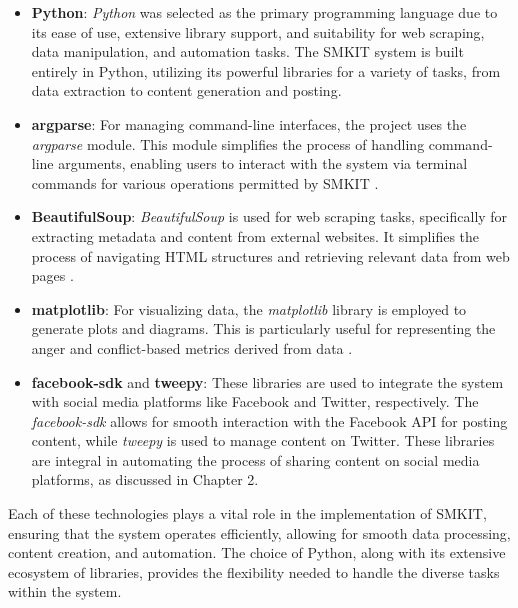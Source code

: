 \begin{itemize}
    \item \textbf{Python}: \textit{Python} was selected as the primary programming language due to its ease of use, extensive library support, and suitability for web scraping, data manipulation, and automation tasks. The SMKIT system is built entirely in Python, utilizing its powerful libraries for a variety of tasks, from data extraction to content generation and posting.
    
    \item \textbf{argparse}: For managing command-line interfaces, the project uses the \textit{argparse} module. This module simplifies the process of handling command-line arguments, enabling users to interact with the system via terminal commands for various operations permitted by SMKIT \cite{argparse_documentation}.

    \item \textbf{BeautifulSoup}: \textit{BeautifulSoup} is used for web scraping tasks, specifically for extracting metadata and content from external websites. It simplifies the process of navigating HTML structures and retrieving relevant data from web pages \cite{beautifulsoup_documentation}.

    \item \textbf{matplotlib}: For visualizing data, the \textit{matplotlib} library is employed to generate plots and diagrams. This is particularly useful for representing the anger and conflict-based metrics derived from data \cite{matplotlib_documentation}.
    
    \item \textbf{facebook-sdk} and \textbf{tweepy}: These libraries are used to integrate the system with social media platforms like Facebook and Twitter, respectively. The \textit{facebook-sdk} allows for smooth interaction with the Facebook API for posting content, while \textit{tweepy} is used to manage content on Twitter. These libraries are integral in automating the process of sharing content on social media platforms, as discussed in Chapter 2.

\end{itemize}

Each of these technologies plays a vital role in the implementation of SMKIT, ensuring that the system operates efficiently, allowing for smooth data processing, content creation, and automation. The choice of Python, along with its extensive ecosystem of libraries, provides the flexibility needed to handle the diverse tasks within the system.

